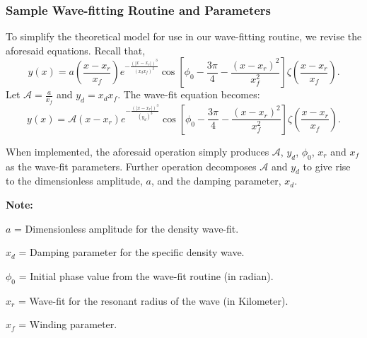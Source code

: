 \documentclass{article}
\begin{document}
\subsubsection{Sample Wave-fitting Routine and Parameters}

To simplify the theoretical model for use in our wave-fitting routine, we revise the aforesaid equations. Recall that,
\begin{equation}
    y(x) = a\left(\frac{x-x_{r}}{x_{f}}\right)e^{-\frac{(|x-x_{r}|)^{3}}{(x_{d}x_{f})^{3}}}\cos\left[\phi_{0} - \frac{3\pi}{4} - \frac{{(x-x_{r})^2}}{{x_{f}^{2}}}\right]\zeta\left(\frac{x-x_{r}}{x_{f}}\right).
\end{equation}
Let $\mathcal{A} = \frac{a}{x_{f}}$ and $y_{d} = x_{d}x_{f}$. The wave-fit equation becomes:
\begin{equation}
    y(x) = \mathcal{A}(x-x_{r})e^{-\frac{(|x-x_{r}|)^{3}}{(y_{d})^{3}}}\cos\left[\phi_{0} - \frac{3\pi}{4} - \frac{{(x-x_{r})^2}}{{x_{f}^{2}}}\right]\zeta(\frac{x-x_{r}}{x_{f}}).
\end{equation}

When implemented, the aforesaid operation simply produces $\mathcal{A}$, $y_{d}$, $\phi_{0}$, $x_{r}$ and $x_{f}$ as the wave-fit parameters. Further operation decomposes $\mathcal{A}$ and $y_{d}$ to give rise to the dimensionless amplitude, $a$, and the damping parameter, $x_{d}$. 

\vspace{3}

\textbf{Note:}

\vspace{3}
\textbf{$a$} = Dimensionless amplitude for the density wave-fit.

\vspace{3}
\textbf{$x_{d}$} = Damping parameter for the specific density wave.

\vspace{3}
\textbf{$\phi_{0}$} = Initial phase value from the wave-fit routine (in radian).

\vspace{3}
\textbf{$x_{r}$} = Wave-fit for the resonant radius of the wave (in Kilometer).

\vspace{3}
\textbf{$x_{f}$} = Winding parameter.
\end{document}
